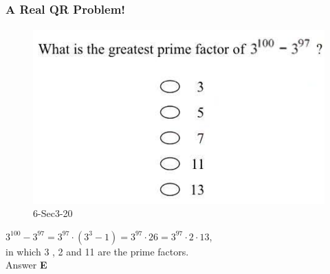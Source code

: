\documentclass[
	11pt, %
]{beamer}
\begin{document}

\begin{frame}
	\frametitle{A Real QR Problem!}
	\framesubtitle{}
	\begin{figure}
		\includegraphics[width=0.5\linewidth]{Prime_Factorization_Example_Question.png}
		\caption{6-Sec3-20}
	\end{figure}
	\pause
$3^{100} - 3^{97} = 3^{97} \cdot (3^3 - 1) = 3^{97} \cdot 26 = 3^{97} \cdot 2 \cdot 13$, \\in which 3 , 2 and 11 are the prime factors. \\
\pause
\bigskip
Answer \textbf{E}
\end{frame}

\end{document}
